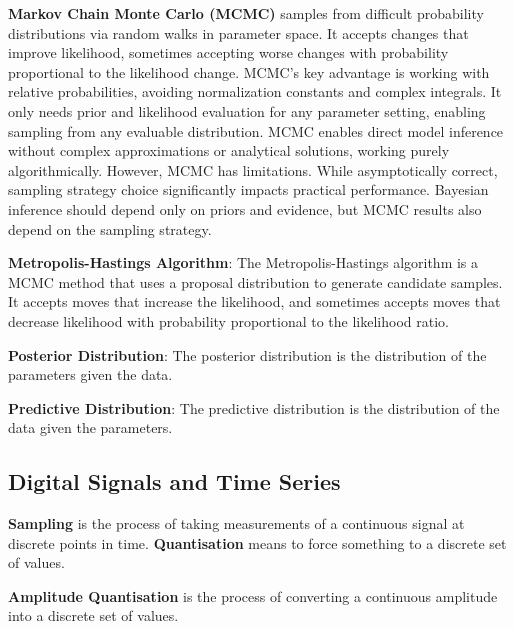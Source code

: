 \documentclass{article}
\begin{document}
\textbf{Markov Chain Monte Carlo (MCMC)} samples from difficult probability distributions via random walks in parameter space. It accepts changes that improve likelihood, sometimes accepting worse changes with probability proportional to the likelihood change.
MCMC's key advantage is working with relative probabilities, avoiding normalization constants and complex integrals. It only needs prior and likelihood evaluation for any parameter setting, enabling sampling from any evaluable distribution.
MCMC enables direct model inference without complex approximations or analytical solutions, working purely algorithmically.
However, MCMC has limitations. While asymptotically correct, sampling strategy choice significantly impacts practical performance. Bayesian inference should depend only on priors and evidence, but MCMC results also depend on the sampling strategy.



\textbf{Metropolis-Hastings Algorithm}:
The Metropolis-Hastings algorithm is a MCMC method that uses a proposal distribution to generate candidate samples.
It accepts moves that increase the likelihood, and sometimes accepts moves that decrease likelihood with probability
proportional to the likelihood ratio.


\textbf{Posterior Distribution}:
The posterior distribution is the distribution of the parameters given the data.

\textbf{Predictive Distribution}:
The predictive distribution is the distribution of the data given the parameters.



\subsection*{Digital Signals and Time Series}


\textbf{Sampling} is the process of taking measurements of a continuous signal at discrete points in time.
\textbf{Quantisation} means to force something to a discrete set of values.


\textbf{Amplitude Quantisation} is the process of converting a continuous amplitude into a discrete set of values.
\end{document}
